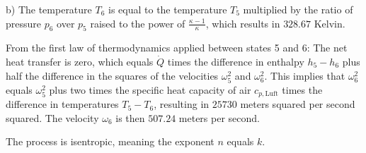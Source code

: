 b) The temperature \( T_6 \) is equal to the temperature \( T_5 \) multiplied by the ratio of pressure \( p_6 \) over \( p_5 \) raised to the power of \( \frac{\kappa - 1}{\kappa} \), which results in \( 328.67 \) Kelvin.

From the first law of thermodynamics applied between states 5 and 6:
The net heat transfer is zero, which equals \( \dot{Q} \) times the difference in enthalpy \( h_5 - h_6 \) plus half the difference in the squares of the velocities \( \omega_5^2 \) and \( \omega_6^2 \). This implies that \( \omega_6^2 \) equals \( \omega_5^2 \) plus two times the specific heat capacity of air \( c_{p, \text{Luft}} \) times the difference in temperatures \( T_5 - T_6 \), resulting in \( 25730 \) meters squared per second squared. The velocity \( \omega_6 \) is then \( 507.24 \) meters per second.

The process is isentropic, meaning the exponent \( n \) equals \( k \).